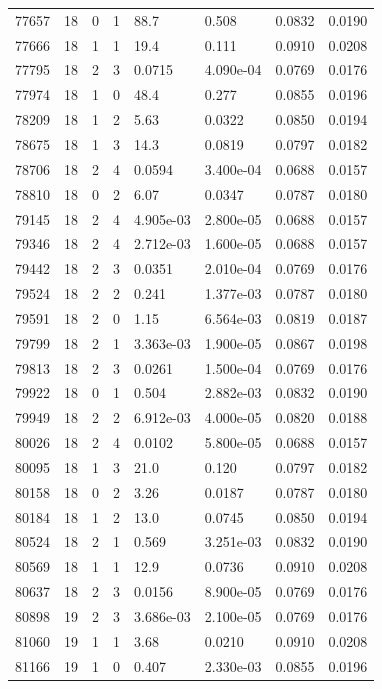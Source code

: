 \documentclass[preview]{standalone}
\begin{document}
{{{{{{{\begin{tabular}{L{1.2cm}C{1.2cm} C{0.3cm}C{0.5cm} C{1.4cm}C{1.4cm} C{1.4cm}C{1.4cm}}
  77657  &    18  & 0     &  1 &  88.7  & 0.508  & 0.0832 &  0.0190   \\ 
  77666  &    18  & 1     &  1 &  19.4  & 0.111  & 0.0910 &  0.0208   \\ 
  77795  &    18  & 2     &  3 &  0.0715  & 4.090e-04  & 0.0769 &  0.0176   \\ 
  77974  &    18  & 1     &  0 &  48.4  & 0.277  & 0.0855 &  0.0196   \\ 
  78209  &    18  & 1     &  2 &  5.63  & 0.0322  & 0.0850 &  0.0194   \\ 
  78675  &    18  & 1     &  3 &  14.3  & 0.0819  & 0.0797 &  0.0182   \\ 
  78706  &    18  & 2     &  4 &  0.0594  & 3.400e-04  & 0.0688 &  0.0157   \\ 
  78810  &    18  & 0     &  2 &  6.07  & 0.0347  & 0.0787 &  0.0180   \\ 
  79145  &    18  & 2     &  4 &  4.905e-03  & 2.800e-05  & 0.0688 &  0.0157   \\ 
  79346  &    18  & 2     &  4 &  2.712e-03  & 1.600e-05  & 0.0688 &  0.0157   \\ 
  79442  &    18  & 2     &  3 &  0.0351  & 2.010e-04  & 0.0769 &  0.0176   \\ 
  79524  &    18  & 2     &  2 &  0.241  & 1.377e-03  & 0.0787 &  0.0180   \\ 
  79591  &    18  & 2     &  0 &  1.15  & 6.564e-03  & 0.0819 &  0.0187   \\ 
  79799  &    18  & 2     &  1 &  3.363e-03  & 1.900e-05  & 0.0867 &  0.0198   \\ 
  79813  &    18  & 2     &  3 &  0.0261  & 1.500e-04  & 0.0769 &  0.0176   \\ 
  79922  &    18  & 0     &  1 &  0.504  & 2.882e-03  & 0.0832 &  0.0190   \\ 
  79949  &    18  & 2     &  2 &  6.912e-03  & 4.000e-05  & 0.0820 &  0.0188   \\ 
  80026  &    18  & 2     &  4 &  0.0102  & 5.800e-05  & 0.0688 &  0.0157   \\ 
  80095  &    18  & 1     &  3 &  21.0  & 0.120  & 0.0797 &  0.0182   \\ 
  80158  &    18  & 0     &  2 &  3.26  & 0.0187  & 0.0787 &  0.0180   \\ 
  80184  &    18  & 1     &  2 &  13.0  & 0.0745  & 0.0850 &  0.0194   \\ 
  80524  &    18  & 2     &  1 &  0.569  & 3.251e-03  & 0.0832 &  0.0190   \\ 
  80569  &    18  & 1     &  1 &  12.9  & 0.0736  & 0.0910 &  0.0208   \\ 
  80637  &    18  & 2     &  3 &  0.0156  & 8.900e-05  & 0.0769 &  0.0176   \\ 
  80898  &    19  & 2     &  3 &  3.686e-03  & 2.100e-05  & 0.0769 &  0.0176   \\ 
  81060  &    19  & 1     &  1 &  3.68  & 0.0210  & 0.0910 &  0.0208   \\ 
  81166  &    19  & 1     &  0 &  0.407  & 2.330e-03  & 0.0855 &  0.0196   \\ 
\hline 
\end{tabular} 

}}}}}}}
\end{document}
